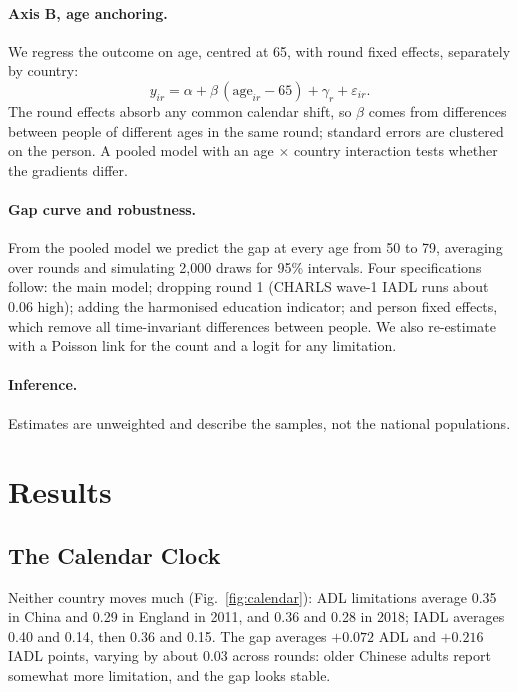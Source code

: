 \documentclass[runningheads]{llncs}
\begin{document}
\paragraph{Axis B, age anchoring.} We regress the outcome on age, centred at 65, with round fixed effects, separately by country:
\begin{equation}
y_{ir} = \alpha + \beta\,(\text{age}_{ir} - 65) + \gamma_r + \varepsilon_{ir}.
\end{equation}
The round effects absorb any common calendar shift, so $\beta$ comes from differences between people of different ages in the same round; standard errors are clustered on the person. A pooled model with an age $\times$ country interaction tests whether the gradients differ.

\paragraph{Gap curve and robustness.} From the pooled model we predict the gap at every age from 50 to 79, averaging over rounds and simulating 2,000 draws for 95\% intervals. Four specifications follow: the main model; dropping round 1 (CHARLS wave-1 IADL runs about 0.06 high); adding the harmonised education indicator; and person fixed effects, which remove all time-invariant differences between people. We also re-estimate with a Poisson link for the count and a logit for any limitation.

\paragraph{Inference.} Estimates are unweighted and describe the samples, not the national populations.

\section{Results}

\subsection{The Calendar Clock}

Neither country moves much (Fig.~\ref{fig:calendar}): ADL limitations average 0.35 in China and 0.29 in England in 2011, and 0.36 and 0.28 in 2018; IADL averages 0.40 and 0.14, then 0.36 and 0.15. The gap averages $+0.072$ ADL and $+0.216$ IADL points, varying by about 0.03 across rounds: older Chinese adults report somewhat more limitation, and the gap looks stable.
\end{document}
